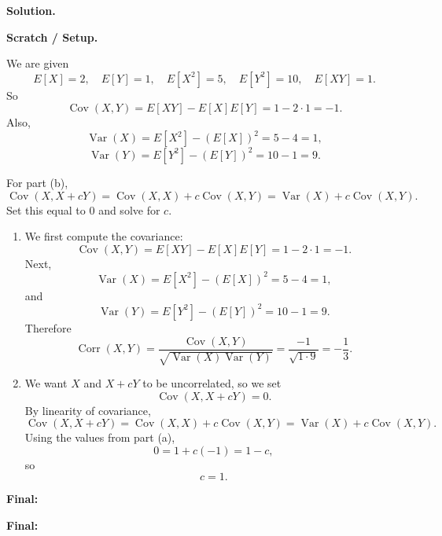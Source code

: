 \documentclass[12pt]{article}
\newenvironment{solution}{%
  \noindent\textbf{Solution.}\ \ignorespaces
}{\par}
\newenvironment{scratch}{%
  \begin{boxnote}\textbf{Scratch / Setup.}\ \small
}{\end{boxnote}}
\newcommand{\finalanswer}[1]{%
  \par\medskip
  \noindent\textbf{Final:}\ \fbox{$#1$}\par
} %
\begin{document}
\begin{solution}
\begin{scratch}
We are given
\[
E[X]=2,\quad E[Y]=1,\quad E[X^2]=5,\quad E[Y^2]=10,\quad E[XY]=1.
\]
So
\[
\operatorname{Cov}(X,Y)=E[XY]-E[X]E[Y]=1-2\cdot 1=-1.
\]
Also,
\[
\operatorname{Var}(X)=E[X^2]-(E[X])^2=5-4=1,
\]
\[
\operatorname{Var}(Y)=E[Y^2]-(E[Y])^2=10-1=9.
\]

For part (b),
\[
\operatorname{Cov}(X,X+cY)=\operatorname{Cov}(X,X)+c\operatorname{Cov}(X,Y)
=\operatorname{Var}(X)+c\operatorname{Cov}(X,Y).
\]
Set this equal to $0$ and solve for $c$.
\end{scratch}

\begin{enumerate}[label=\textbf{(\alph*)}]
  \item We first compute the covariance:
  \[
  \operatorname{Cov}(X,Y)=E[XY]-E[X]E[Y]=1-2\cdot 1=-1.
  \]
  Next,
  \[
  \operatorname{Var}(X)=E[X^2]-(E[X])^2=5-4=1,
  \]
  and
  \[
  \operatorname{Var}(Y)=E[Y^2]-(E[Y])^2=10-1=9.
  \]
  Therefore
  \[
  \operatorname{Corr}(X,Y)
  =\frac{\operatorname{Cov}(X,Y)}{\sqrt{\operatorname{Var}(X)\operatorname{Var}(Y)}}
  =\frac{-1}{\sqrt{1\cdot 9}}
  =-\frac13.
  \]

  \item We want $X$ and $X+cY$ to be uncorrelated, so we set
  \[
  \operatorname{Cov}(X,X+cY)=0.
  \]
  By linearity of covariance,
  \[
  \operatorname{Cov}(X,X+cY)
  =\operatorname{Cov}(X,X)+c\operatorname{Cov}(X,Y)
  =\operatorname{Var}(X)+c\operatorname{Cov}(X,Y).
  \]
  Using the values from part (a),
  \[
  0=1+c(-1)=1-c,
  \]
  so
  \[
  c=1.
  \]
\end{enumerate}

\finalanswer{\text{(a)}\ \operatorname{Corr}(X,Y)=-\frac13}
\finalanswer{\text{(b)}\ c=1}
\end{solution}
\end{document}
